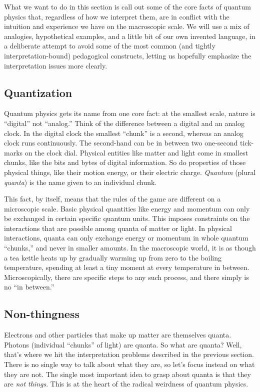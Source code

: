 \documentclass[onecolumn,preprintnumbers,amsmath,amssymbn,reprint,nofootinbib,superscriptaddress]{revtex4}    %
\begin{document}
What we want to do in this section is call out some of the core facts of quantum physics that, regardless of how we interpret them, are in conflict with the intuition and experience we have on the macroscopic scale.  We will use a mix of analogies, hypothetical examples, and a little bit of our own invented language, in a deliberate attempt to avoid some of the most common (and tightly interpretation-bound) pedagogical constructs, letting us hopefully emphasize the interpretation issues more clearly.

\subsection{Quantization}
\label{quantization}

Quantum physics gets its name from one core fact:  at the smallest scale, nature is ``digital'' not ``analog.'' Think of the difference between a digital and an analog clock. In the digital clock the smallest ``chunk'' is a second, whereas an analog clock runs continuously.  The second-hand can be in between two one-second tick-marks on the clock dial. Physical entities like matter and light come in smallest chunks, like the bits and bytes of digital information.  So do properties of those physical things, like their motion energy, or their electric charge.  {\em Quantum} (plural {\em quanta}) is the name given to an individual chunk.

This fact, by itself, means that the rules of the game are different on a microscopic scale. Basic physical quantities like energy and momentum can only be exchanged in certain specific quantum units.  This imposes constraints on the interactions that are possible among quanta of matter or light.  In physical interactions, quanta can only exchange energy or momentum in whole quantum ``chunks,'' and never in smaller amounts.  In the macroscopic world, it is as though a tea kettle heats up by gradually warming up from zero to the boiling temperature, spending at least a tiny moment at every temperature in between.  Microscopically, there are specific steps to any such process, and there simply is no ``in between.'' 
\subsection{Non-thingness}
\label{nonthingess}

Electrons and other particles that make up matter are themselves quanta.  Photons (individual ``chunks'' of light) are quanta.  So what are quanta?  Well, that's where we hit the interpretation problems described in the previous section.  There is no single way to talk about what they are, so let's focus instead on what they are not.  The single most important idea to grasp about quanta is that they are {\em not things}.  This is at the heart of the radical weirdness of quantum physics.
\end{document}
